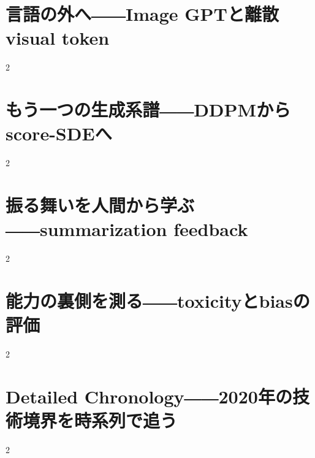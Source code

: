 \documentclass[lualatex,a4paper,11pt]{jlreq}
\begin{document}
\clearpage
\section{言語の外へ――Image GPTと離散visual token}
\label{pkg:media-autoregressive}

\medskip
\begin{multicols}{2}

\end{multicols}


\clearpage
\section{もう一つの生成系譜――DDPMからscore-SDEへ}
\label{pkg:diffusion-score}

\medskip
\begin{multicols}{2}

\end{multicols}


\clearpage
\section{振る舞いを人間から学ぶ――summarization feedback}
\label{pkg:feedback-steering}

\medskip
\begin{multicols}{2}

\end{multicols}


\clearpage
\section{能力の裏側を測る――toxicityとbiasの評価}
\label{pkg:evaluation-risk}

\medskip
\begin{multicols}{2}

\end{multicols}


\clearpage
\section{Detailed Chronology――2020年の技術境界を時系列で追う}
\label{pkg:annual-chronology}

\medskip
\begin{multicols}{2}

\end{multicols}

\end{document}

